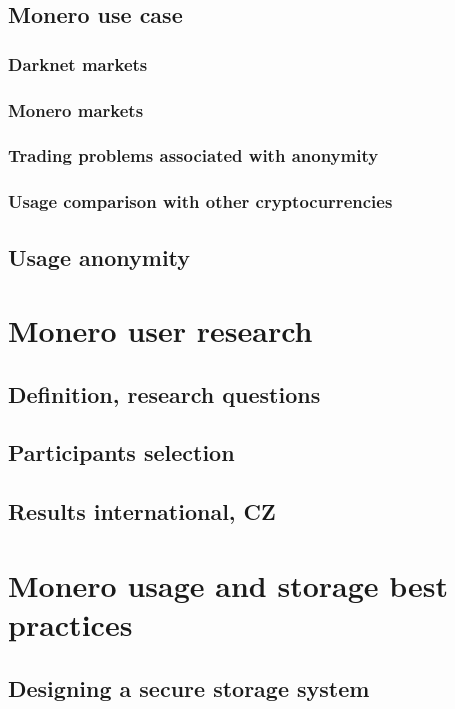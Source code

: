 \documentclass[
  printed, %
  table,   %
  nolof,     %
  nolot,     %
           oneside, color
]{fithesis3}
\begin{document}
\section{Monero use case}

\subsection{Darknet markets}

\subsection{Monero markets}

\subsection{Trading problems associated with anonymity}

\subsection{Usage comparison with other cryptocurrencies}


\section{Usage anonymity}

\chapter{Monero user research}
\section{Definition, research questions}
\section{Participants selection}
\section{Results international, CZ}

\chapter{Monero usage and storage best practices}
\section{Designing a secure storage system}
\end{document}

